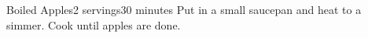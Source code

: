 \documentclass[../Cookbook.tex]{subfiles}
\begin{document}
\begin{recipe}{Boiled Apples}{2 servings}{30 minutes}
	Put in a small saucepan and heat to a simmer. Cook until apples are done.
\end{recipe}
\end{document}
